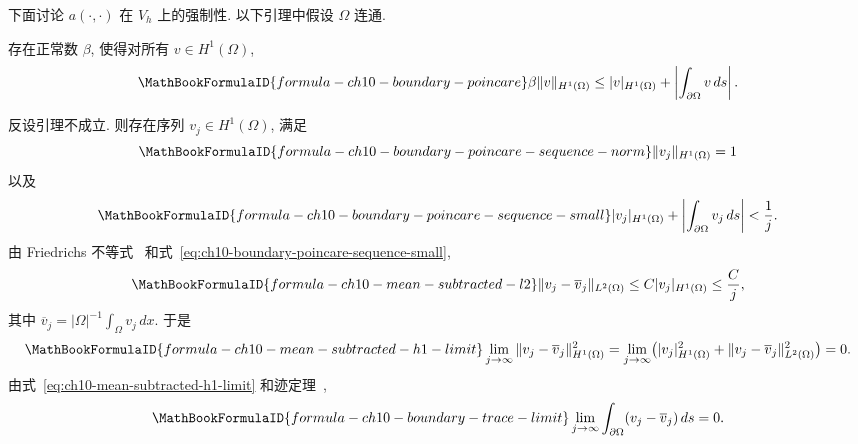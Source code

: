 下面讨论 $a(\cdot,\cdot)$ 在 $V_h$ 上的强制性. 以下引理中假设 $\Omega$ 连通.

\begin{Lemma}
\label{lem:ch10-boundary-poincare}
存在正常数 $\beta$, 使得对所有 $v\in H^1(\Omega)$,
\begin{equation}
\MathBookFormulaID{formula-ch10-boundary-poincare}
\label{eq:ch10-boundary-poincare}
\beta\|v\|_{H^1(\Omega)}\leq|v|_{H^1(\Omega)}
+\left|\int_{\partial\Omega}v\,ds\right|.
\end{equation}
\end{Lemma}

\begin{Proof}
反设引理不成立. 则存在序列 $v_j\in H^1(\Omega)$, 满足
\begin{equation}
\MathBookFormulaID{formula-ch10-boundary-poincare-sequence-norm}
\label{eq:ch10-boundary-poincare-sequence-norm}
\|v_j\|_{H^1(\Omega)}=1
\end{equation}
以及
\begin{equation}
\MathBookFormulaID{formula-ch10-boundary-poincare-sequence-small}
\label{eq:ch10-boundary-poincare-sequence-small}
|v_j|_{H^1(\Omega)}+\left|\int_{\partial\Omega}v_j\,ds\right|<\frac1j.
\end{equation}
由 Friedrichs 不等式~ 和式~\eqref{eq:ch10-boundary-poincare-sequence-small},
\begin{equation}
\MathBookFormulaID{formula-ch10-mean-subtracted-l2}
\label{eq:ch10-mean-subtracted-l2}
\|v_j-\overline v_j\|_{L^2(\Omega)}\leq C|v_j|_{H^1(\Omega)}\leq\frac Cj,
\end{equation}
其中 $\overline v_j=|\Omega|^{-1}\int_\Omega v_j\,dx$. 于是
\begin{equation}
\MathBookFormulaID{formula-ch10-mean-subtracted-h1-limit}
\label{eq:ch10-mean-subtracted-h1-limit}
\lim_{j\to\infty}\|v_j-\overline v_j\|_{H^1(\Omega)}^2
=\lim_{j\to\infty}\bigl(|v_j|_{H^1(\Omega)}^2
+\|v_j-\overline v_j\|_{L^2(\Omega)}^2\bigr)=0.
\end{equation}
由式~\eqref{eq:ch10-mean-subtracted-h1-limit} 和迹定理~,
\begin{equation}
\MathBookFormulaID{formula-ch10-boundary-trace-limit}
\label{eq:ch10-boundary-trace-limit}
\lim_{j\to\infty}\int_{\partial\Omega}(v_j-\overline v_j)\,ds=0.
\end{equation}

\end{Proof}

